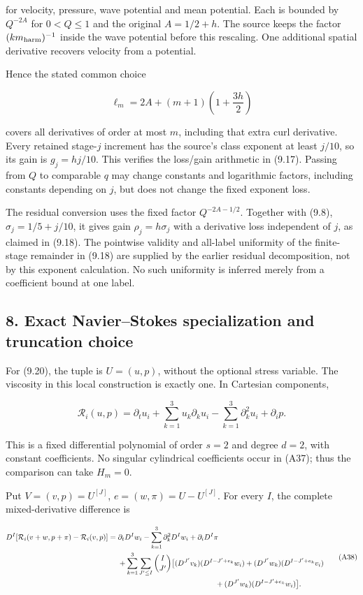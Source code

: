 \documentclass[10pt,a4paper]{article}
\begin{document}
for velocity, pressure, wave potential and mean potential. Each is bounded by \(Q^{-2A}\) for \(0<Q\le1\) and the original \(A=1/2+h\). The source keeps the factor \((km_{\rm harm})^{-1}\) inside the wave potential before this rescaling. One additional spatial derivative recovers velocity from a potential.

Hence the stated common choice

\[
\ell_m=2A+(m+1)\left(1+\frac{3h}{2}\right)
\tag{A36}
\]

covers all derivatives of order at most \(m\), including that extra curl derivative. Every retained stage-\(j\) increment has the source's class exponent at least \(j/10\), so its gain is \(g_j=hj/10\). This verifies the loss/gain arithmetic in (9.17). Passing from \(Q\) to comparable \(q\) may change constants and logarithmic factors, including constants depending on \(j\), but does not change the fixed exponent loss.

The residual conversion uses the fixed factor \(Q^{-2A-1/2}\). Together with (9.8), \(\sigma_j=1/5+j/10\), it gives gain \(\rho_j=h\sigma_j\) with a derivative loss independent of \(j\), as claimed in (9.18). The pointwise validity and all-label uniformity of the finite-stage remainder in (9.18) are supplied by the earlier residual decomposition, not by this exponent calculation. No such uniformity is inferred merely from a coefficient bound at one label.

\subsection{8. Exact Navier--Stokes specialization and truncation choice}\label{exact-navierstokes-specialization-and-truncation-choice}

For (9.20), the tuple is \(U=(u,p)\), without the optional stress variable. The viscosity in this local construction is exactly one. In Cartesian components,

\[
\mathcal R_i(u,p)=\partial_tu_i+\sum_{k=1}^3u_k\partial_ku_i
-\sum_{k=1}^3\partial_k^2u_i+\partial_ip.
\tag{A37}
\]

This is a fixed differential polynomial of order \(s=2\) and degree \(d=2\), with constant coefficients. No singular cylindrical coefficients occur in (A37); thus the comparison can take \(H_m=0\).

Put \(V=(v,p)=U^{[J]}\), \(e=(w,\pi)=U-U^{[J]}\). For every \(I\), the complete mixed-derivative difference is

\[
\begin{aligned}
D^I[\mathcal R_i(v+w,p+\pi)-\mathcal R_i(v,p)]
={}&\partial_tD^Iw_i-\sum_{k=1}^3\partial_k^2D^Iw_i+\partial_iD^I\pi\\
&+\sum_{k=1}^3\sum_{J'\le I}\binom I{J'}
\big[
(D^{J'}v_k)(D^{I-J'+e_k}w_i)
+(D^{J'}w_k)(D^{I-J'+e_k}v_i)\\
&\hspace{46mm}+(D^{J'}w_k)(D^{I-J'+e_k}w_i)
\big].
\end{aligned}
\tag{A38}
\]
\end{document}
